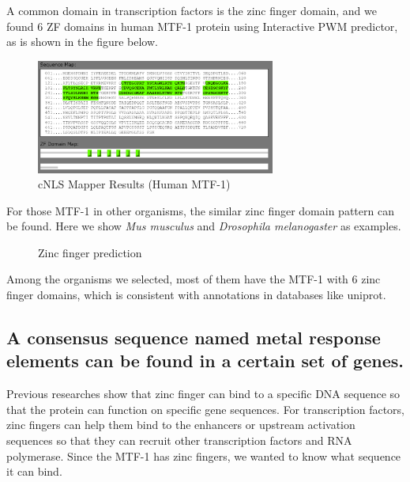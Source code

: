 A common domain in transcription factors is the zinc finger domain, and we found 6 ZF domains in human MTF-1 protein using Interactive PWM predictor, as is shown in the figure below.

\begin{figure}[H]
    \centering
    \includegraphics[width=0.7\textwidth]{image/ZFO.png}
    \caption{cNLS Mapper Results (Human MTF-1)}
    \label{HZFP}
\end{figure}

For those MTF-1 in other organisms, the similar zinc finger domain pattern can be found. Here we show \textit{Mus musculus} and \textit{Drosophila melanogaster} as examples.
\begin{figure}[H]
    \centering
    \caption{Zinc finger prediction}
    \label{ZFP}
\end{figure}

Among the organisms we selected, most of them have the MTF-1 with 6 zinc finger domains, which is consistent with annotations in databases like uniprot.

\subsection{A consensus sequence named metal response elements can be found in a certain set of genes.}

Previous researches show that zinc finger can bind to a specific DNA sequence so that the protein can function on specific gene sequences. For transcription factors, zinc fingers can help them bind to the enhancers or upstream activation sequences so that they can recruit other transcription factors and RNA polymerase. Since the MTF-1 has zinc fingers, we wanted to know what sequence it can bind.

